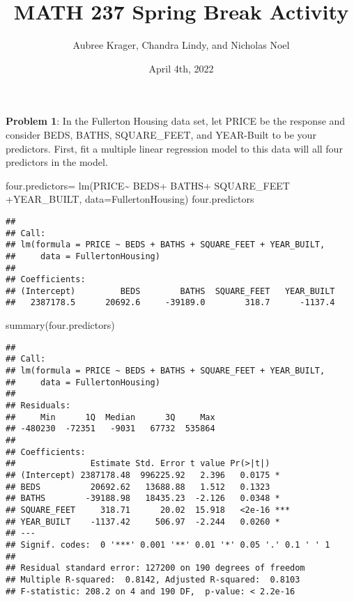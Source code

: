 \documentclass[
]{article}
\title{MATH 237 Spring Break Activity}
\author{Aubree Krager, Chandra Lindy, and Nicholas Noel}
\date{April 4th, 2022}
\newenvironment{Shaded}{\begin{snugshade}}{\end{snugshade}}
\newcommand{\AttributeTok}[1]{\textcolor[rgb]{0.77,0.63,0.00}{#1}}
\newcommand{\FunctionTok}[1]{\textcolor[rgb]{0.00,0.00,0.00}{#1}}
\newcommand{\NormalTok}[1]{#1}
\newcommand{\OtherTok}[1]{\textcolor[rgb]{0.56,0.35,0.01}{#1}}
\newcommand{\SpecialCharTok}[1]{\textcolor[rgb]{0.00,0.00,0.00}{#1}}
\begin{document}
\maketitle

\textbf{Problem 1}: In the Fullerton Housing data set, let PRICE be the
response and consider BEDS, BATHS, SQUARE\_FEET, and YEAR-Built to be
your predictors. First, fit a multiple linear regression model to this
data will all four predictors in the model.

\begin{Shaded}
\begin{Highlighting}[]
\NormalTok{four.predictors}\OtherTok{=} \FunctionTok{lm}\NormalTok{(PRICE}\SpecialCharTok{\textasciitilde{}}\NormalTok{ BEDS}\SpecialCharTok{+}\NormalTok{ BATHS}\SpecialCharTok{+}\NormalTok{ SQUARE\_FEET }\SpecialCharTok{+}\NormalTok{YEAR\_BUILT, }\AttributeTok{data=}\NormalTok{FullertonHousing)}
\NormalTok{four.predictors}
\end{Highlighting}
\end{Shaded}

\begin{verbatim}
## 
## Call:
## lm(formula = PRICE ~ BEDS + BATHS + SQUARE_FEET + YEAR_BUILT, 
##     data = FullertonHousing)
## 
## Coefficients:
## (Intercept)         BEDS        BATHS  SQUARE_FEET   YEAR_BUILT  
##   2387178.5      20692.6     -39189.0        318.7      -1137.4
\end{verbatim}

\begin{Shaded}
\begin{Highlighting}[]
\FunctionTok{summary}\NormalTok{(four.predictors)}
\end{Highlighting}
\end{Shaded}

\begin{verbatim}
## 
## Call:
## lm(formula = PRICE ~ BEDS + BATHS + SQUARE_FEET + YEAR_BUILT, 
##     data = FullertonHousing)
## 
## Residuals:
##     Min      1Q  Median      3Q     Max 
## -480230  -72351   -9031   67732  535864 
## 
## Coefficients:
##               Estimate Std. Error t value Pr(>|t|)    
## (Intercept) 2387178.48  996225.92   2.396   0.0175 *  
## BEDS          20692.62   13688.88   1.512   0.1323    
## BATHS        -39188.98   18435.23  -2.126   0.0348 *  
## SQUARE_FEET     318.71      20.02  15.918   <2e-16 ***
## YEAR_BUILT    -1137.42     506.97  -2.244   0.0260 *  
## ---
## Signif. codes:  0 '***' 0.001 '**' 0.01 '*' 0.05 '.' 0.1 ' ' 1
## 
## Residual standard error: 127200 on 190 degrees of freedom
## Multiple R-squared:  0.8142, Adjusted R-squared:  0.8103 
## F-statistic: 208.2 on 4 and 190 DF,  p-value: < 2.2e-16
\end{verbatim}
\end{document}
